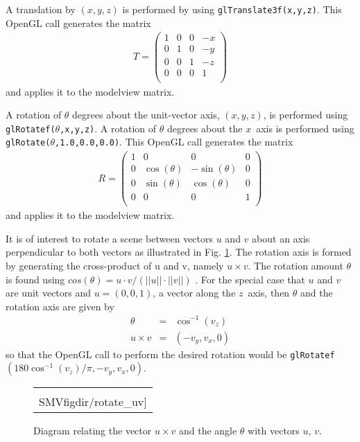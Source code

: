 \documentclass[11pt,twoside]{book}
\begin{document}
A translation by $(x,y,z)$ is performed by using {\tt glTranslate3f(x,y,z)}.
This OpenGL call generates the matrix
\begin{eqnarray}
T=\left(%
\begin{array}{cccc}
  1 & 0 & 0 & -x \\
  0 & 1 & 0 & -y \\
  0 & 0 & 1 & -z \\
  0 & 0 & 0 & 1 \\
\end{array}%
\right)
\end{eqnarray}
and applies it to the modelview matrix.

A rotation of $\theta$ degrees about the unit-vector axis, $(x,y,z)$,
is performed using {\tt glRotatef($\theta$,x,y,z)}.  A rotation of
$\theta$ degrees about the $x$~axis is performed using {\tt glRotate($\theta$,1.0,0.0,0.0)}.
This OpenGL call generates the matrix
\begin{eqnarray}
R=\left(%
\begin{array}{cccc}
  1 & 0 & 0 & 0 \\
  0 & \cos(\theta) & -\sin(\theta) & 0 \\
  0 & \sin(\theta) & \cos(\theta) & 0 \\
  0 & 0 & 0 & 1 \\
\end{array}%
\right)
\end{eqnarray}
and applies it to the modelview matrix.

It is of interest to rotate a scene between vectors $u$ and $v$
about an axis perpendicular to both vectors as illustrated in Fig.
\ref{figrotateuv}. The rotation axis is formed by generating the
cross-product of u and v, namely $u\times v$.  The rotation amount
$\theta$ is found using $cos(\theta)=u\cdot v/(||u||\cdot ||v||)$
.  For the special case that $u$ and $v$ are unit vectors and
$u=(0,0,1)$, a vector along the $z$~axis, then $\theta$ and the
rotation axis are given by
\begin{eqnarray}
\theta&=&\cos^{-1}(v_z)\\
u\times v&=&(-v_y,v_x,0)
\end{eqnarray}
so that the OpenGL call to perform the desired rotation would be
{\tt glRotatef}$(180\cos^{-1}(v_z)/\pi,-v_y,v_x,0)$.

\begin{figure}[bph]
\begin{center}
\begin{tabular}{c}
\texttt{[image: \\SMVfigdir/rotate\_uv]}
\end{tabular}
\end{center}
\caption{Diagram relating the vector $u\times v$ and the angle $\theta$
with vectors $u$, $v$. }
\label{figrotateuv}
\end{figure}
\end{document}
